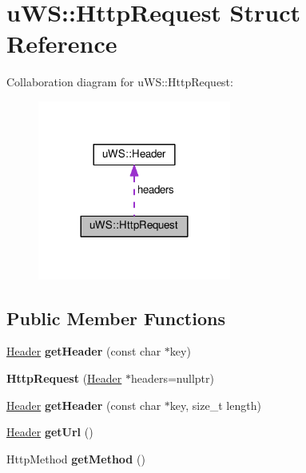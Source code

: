 \hypertarget{structu_w_s_1_1_http_request}{}\section{u\+WS\+:\+:Http\+Request Struct Reference}
\label{structu_w_s_1_1_http_request}


Collaboration diagram for u\+WS\+:\+:Http\+Request\+:
\nopagebreak
\begin{figure}[H]
\begin{center}
\leavevmode
\includegraphics[width=180pt]{structu_w_s_1_1_http_request__coll__graph}
\end{center}
\end{figure}
\subsection*{Public Member Functions}
\begin{DoxyCompactItemize}
\item 
\mbox{\label{structu_w_s_1_1_http_request_a7d59a674c7ec688d89bb4709817a8cb5}} 
\mbox{\hyperlink{structu_w_s_1_1_header}{Header}} {\bfseries get\+Header} (const char $\ast$key)
\item 
\mbox{\label{structu_w_s_1_1_http_request_a3dc6e69028ae600f591ced776e7024ab}} 
{\bfseries Http\+Request} (\mbox{\hyperlink{structu_w_s_1_1_header}{Header}} $\ast$headers=nullptr)
\item 
\mbox{\label{structu_w_s_1_1_http_request_a4bb9d430e7482ac303f57cf52562c9e6}} 
\mbox{\hyperlink{structu_w_s_1_1_header}{Header}} {\bfseries get\+Header} (const char $\ast$key, size\+\_\+t length)
\item 
\mbox{\label{structu_w_s_1_1_http_request_aba68e883c1021b2bffd63a8e945657d6}} 
\mbox{\hyperlink{structu_w_s_1_1_header}{Header}} {\bfseries get\+Url} ()
\item 
\mbox{\label{structu_w_s_1_1_http_request_a4787928682f9f7cd82ad0b498bc67674}} 
Http\+Method {\bfseries get\+Method} ()
\end{DoxyCompactItemize}
